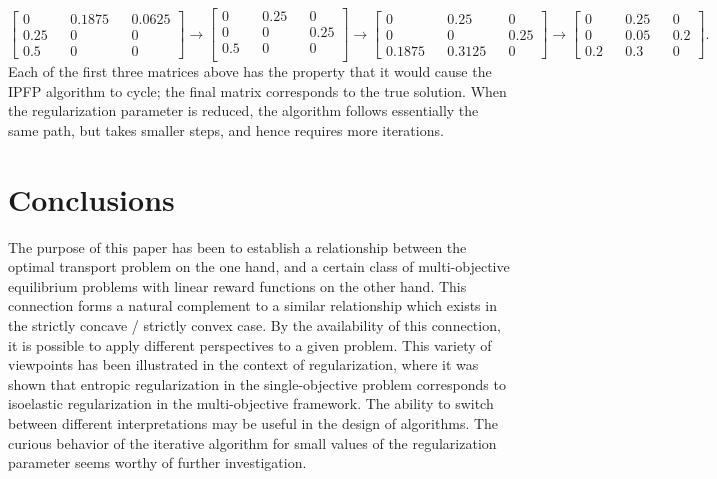 \documentclass{article}
\theoremstyle{definition}
\begin{document}
$$
\begin{bmatrix}
         0   &&  0.1875   &&  0.0625 \\
    0.25   &&    0          &&   0         \\
    0.5     &&    0          &&   0
\end{bmatrix}
\rightarrow
\begin{bmatrix}
         0   &&  0.25 &&        0 \\
        0    &&    0    && 0.25   \\
      0.5   &&    0    &&     0    \\
\end{bmatrix}
\rightarrow
\begin{bmatrix}
         0    && 0.25  &&       0 \\
         0   && 0 &&    0.25     \\
    0.1875   &&  0.3125    && 0
\end{bmatrix}
\rightarrow
\begin{bmatrix}
         0    && 0.25    &&    0 \\
         0    && 0.05    && 0.2 \\
      0.2    && 0.3      &&  0
\end{bmatrix}.
$$
Each of the first three matrices above has the property that it would cause the IPFP algorithm to cycle; the final matrix corresponds to the true solution. When the regularization parameter is reduced, the algorithm follows essentially the same path, but takes smaller steps, and hence requires more iterations.

\section{Conclusions} \label{conclusions}

The purpose of this paper has been to establish a relationship between the optimal transport problem on the one hand, and a certain class of multi-objective equilibrium problems with linear reward functions on the other hand. This connection forms a natural complement to a similar relationship which exists in the strictly concave / strictly convex case. By the availability of this connection, it is possible to apply different perspectives to a given problem. This variety of viewpoints has been illustrated in the context of regularization, where it was shown that entropic regularization in the single-objective problem corresponds to isoelastic regularization in the multi-objective framework. The ability to switch between different interpretations may be useful in the design of algorithms. The curious behavior of the iterative algorithm for small values of the regularization parameter seems worthy of further investigation.
\end{document}
